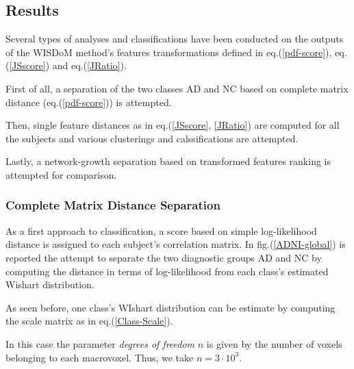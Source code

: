 \documentclass[12pt,openright,twoside,a4paper]{book}
\begin{document}
\subsection{Results}

Several types of analyses and classifications have been conducted on the outputs of the WISDoM method's  features transformations defined in eq.(\ref{pdf-score}), eq.(\ref{JSscore}) and eq.(\ref{JRatio}).

First of all, a separation of the two classes AD and NC based on complete matrix distance (eq.(\ref{pdf-score})) is attempted.

Then, single feature distances as in eq.(\ref{JSscore}, \ref{JRatio}) are computed for all the subjects and various clusterings and calssifications are attempted.

Lastly, a network-growth separation based on transformed features ranking is attempted for comparison.

\subsubsection*{Complete Matrix Distance Separation}

As a first approach to classification, a score based on simple log-likelihood distance is assigned to each subject's correlation matrix. In fig.(\ref{ADNI-global}) is reported the attempt to separate the two diagnostic groups AD and NC by computing the distance in terms of log-likelihood from each class's estimated Wishart distribution.

As seen before, one class's WIshart distribution can be estimate by computing the scale matrix as in eq.(\ref{Class-Scale}). 

In this case the parameter \textit{degrees of freedom} $n$ is given by the number of voxels belonging to each macrovoxel. Thus, we take $n=3\cdot 10^3$.
\end{document}
